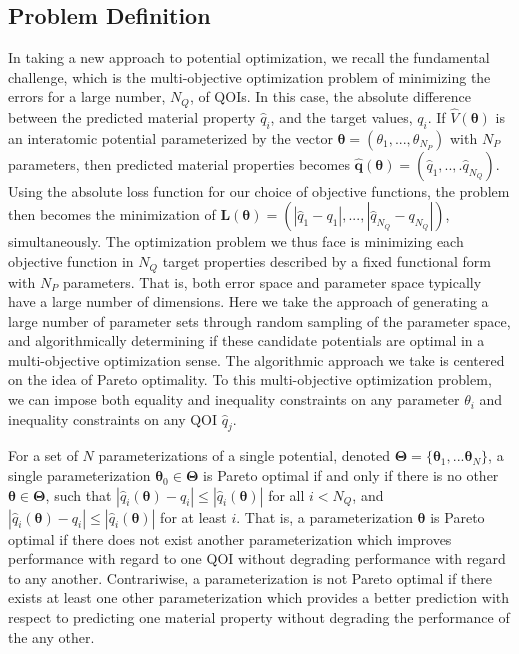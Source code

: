 \subsection{Problem Definition}

In taking a new approach to potential optimization, we recall the fundamental challenge, which is the multi-objective optimization problem of minimizing the errors for a large number, $N_Q$, of QOIs. In this case, the absolute difference between the predicted material property $\hat{q}_i$, and the target values, $q_i$.  If  $\hat{V}(\bm{\theta})$ is an interatomic potential parameterized by the vector $\bm{\theta} = (\theta_1,...,\theta_{N_P})$ with $N_P$ parameters, then predicted material properties becomes $\hat{\bm{q}}(\bm{\theta}) = (\hat{q}_1,..,.\hat{q}_{N_Q})$.
Using the absolute loss function for our choice of objective functions, the problem then becomes the minimization of  $\bm{L}(\bm{\theta}) = (|\hat{q}_1-q_1|,...,|\hat{q}_{N_Q}-q_{N_Q}|)$, simultaneously.
The optimization problem we thus face is minimizing each objective function in $N_Q$ target properties described by a fixed functional form with $N_P$ parameters.  That is, both error space and parameter space typically have a large number of dimensions.  Here we take the approach of generating a large number of parameter sets through random sampling of the parameter space, and algorithmically determining if these candidate potentials are optimal in a multi-objective optimization sense.  The algorithmic approach we take is centered on the idea of Pareto optimality.  To this multi-objective optimization problem, we can impose both equality and inequality constraints on any parameter $\theta_i$ and inequality constraints on any QOI $\hat{q}_j$.

For a set of $N$ parameterizations of a single potential, denoted $\bm{\Theta}= \{\bm{\theta}_1,...\bm{\theta}_N\}$, a single parameterization $\bm{\theta}_0 \in \bm{\Theta}$ is Pareto optimal if and only if there is no other $\bm{\theta} \in \bm{\Theta}$, such that $|\hat{q}_i(\bm{\theta})-q_i| \leq |\hat{q}_i(\bm{\theta})|$
for all $i<N_Q$, and $|\hat{q}_i(\bm{\theta})-q_i| \leq |\hat{q}_i(\bm{\theta})|$ for at least $i$.  That is, a parameterization $\bm{\theta}$ is Pareto optimal if there does not exist another parameterization which improves performance with regard to one QOI without degrading performance with regard to any another.  Contrariwise, a parameterization is not Pareto optimal if there exists at least one other parameterization which provides a better prediction with respect to predicting one material property without degrading the performance of the any other.

